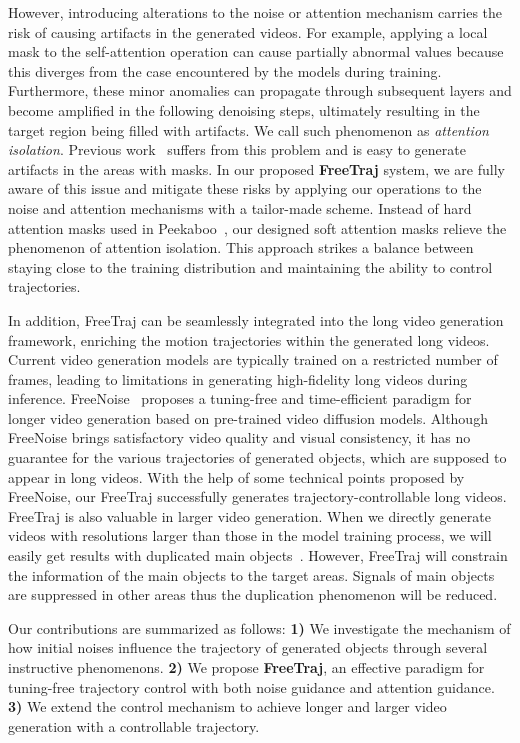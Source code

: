 However, introducing alterations to the noise or attention mechanism carries the risk of causing artifacts in the generated videos. For example, applying a local mask to the self-attention operation can cause partially abnormal values because this diverges from the case encountered by the models during training. Furthermore, these minor anomalies can propagate through subsequent layers and become amplified in the following denoising steps, ultimately resulting in the target region being filled with artifacts. We call such phenomenon as \textit{attention isolation}. Previous work~\citep{jain2023peekaboo} suffers from this problem and is easy to generate artifacts in the areas with masks. In our proposed \textbf{FreeTraj} system, we are fully aware of this issue and mitigate these risks by applying our operations to the noise and attention mechanisms with a tailor-made scheme. Instead of hard attention masks used in Peekaboo~\citep{jain2023peekaboo}, our designed soft attention masks relieve the phenomenon of attention isolation. This approach strikes a balance between staying close to the training distribution and maintaining the ability to control trajectories.

In addition, FreeTraj can be seamlessly integrated into the long video generation framework, enriching the motion trajectories within the generated long videos. Current video generation models are typically trained on a restricted number of frames, leading to limitations in generating high-fidelity long videos during inference. FreeNoise~\citep{freenoise} proposes a tuning-free and time-efficient paradigm for longer video generation based on pre-trained video diffusion models. Although FreeNoise brings satisfactory video quality and visual consistency, it has no guarantee for the various trajectories of generated objects, which are supposed to appear in long videos. With the help of some technical points proposed by FreeNoise, our FreeTraj successfully generates trajectory-controllable long videos. FreeTraj is also valuable in larger video generation. When we directly generate videos with resolutions larger than those in the model training process, we will easily get results with duplicated main objects~\cite {he2023scalecrafter}. However, FreeTraj will constrain the information of the main objects to the target areas. Signals of main objects are suppressed in other areas thus the duplication phenomenon will be reduced.

Our contributions are summarized as follows: \textbf{1)} We investigate the mechanism of how initial noises influence the trajectory of generated objects through several instructive phenomenons. \textbf{2)} We propose \textbf{FreeTraj}, an effective paradigm for tuning-free trajectory control with both noise guidance and attention guidance. \textbf{3)} We extend the control mechanism to achieve longer and larger video generation with a controllable trajectory.
